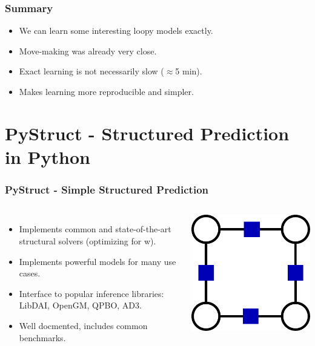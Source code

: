 \documentclass[final,ignorenonframetext,compress]{beamer}
\begin{document}
\begin{frame}
    \frametitle{Summary}
    \begin{itemize}
        \item We can learn some interesting loopy models exactly.
        \item Move-making was already very close.
        \item Exact learning is not necessarily slow ($\approx$5 min).
        \item Makes learning more reproducible and simpler.
    \end{itemize}
\end{frame}




\section{PyStruct - Structured Prediction in Python}
\begin{frame}
    \frametitle{PyStruct - Simple Structured Prediction}
    \begin{columns}
            \begin{itemize}
                \item Implements common and state-of-the-art structural solvers (optimizing for w).
                \item<2-> Implements powerful models for many use cases.
                \item<3-> Interface to popular inference libraries: LibDAI, OpenGM, QPBO, AD3.
                \item<4-> Well docmented, includes common benchmarks.
            \end{itemize}
        \begin{center}
            \includegraphics[width=.6\linewidth]{images/logo_pystruct}
        \end{center}
    \end{columns}
\end{frame}
\end{document}

